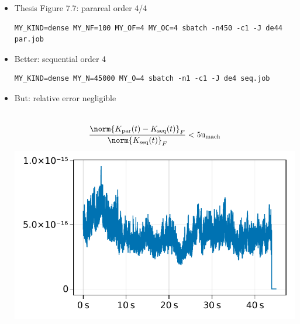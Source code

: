 \begin{frame}[fragile]
  \frametitle{\secname}
  \begin{itemize}
    \item
      Thesis Figure 7.7: parareal order 4/4
      \hyperlink{fig:7.7}{}

      \begin{lstlisting}
MY_KIND=dense MY_NF=100 MY_OF=4 MY_OC=4 sbatch -n450 -c1 -J de44 par.job
      \end{lstlisting}
    \item
      Better: sequential order 4

      \begin{lstlisting}
MY_KIND=dense MY_N=45000 MY_O=4 sbatch -n1 -c1 -J de4 seq.job
      \end{lstlisting}
    \item
      But: relative error negligible
      \begin{minipage}{\linewidth}
      \begin{columns}[totalwidth=\linewidth]
        \begin{equation*}
          \frac{\norm{K_\text{par}(t) - K_\text{seq}(t)}_F}{\norm{K_\text{seq}(t)}_F}
          < 5\umach
        \end{equation*}
        \includegraphics[width=\textwidth]{figures/slides-seq-parareal-ref.pdf}
      \end{columns}
      \end{minipage}
  \end{itemize}
\end{frame}

